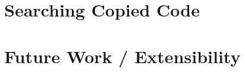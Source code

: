 \section{Searching Copied Code}\label{section:implementation/searching_copied_code}

\section{Future Work / Extensibility}\label{section:implementation/extensibility}
